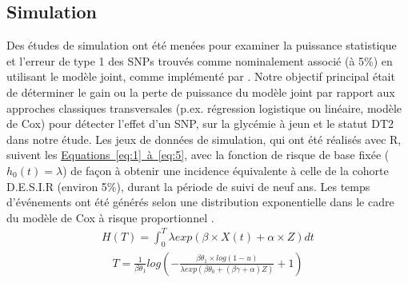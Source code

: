 \documentclass[11pt, a4paper]{article}
\begin{document}
\subsection{Simulation}
\par{Des études de simulation ont été menées pour examiner la puissance statistique et l'erreur de type 1 des SNPs trouvés comme nominalement associé (à 5\%) en utilisant le modèle joint, comme implémenté par \citet{rizopoulos_jm_2010}.
Notre objectif principal était de déterminer le gain ou la perte de puissance du modèle joint par rapport aux approches classiques transversales (p.ex. régression logistique ou linéaire, modèle de Cox)
pour détecter l'effet d'un SNP, sur la glycémie à jeun et le statut DT2 dans notre étude.
Les jeux de données de simulation, qui ont été réalisés avec R, suivent les \hyperref[eq:1]{Equations~\ref*{eq:1}~à~\ref{eq:5}},
avec la fonction de risque de base fixée ($h_0(t)=\lambda$) de façon à obtenir une incidence équivalente à celle de la cohorte D.E.S.I.R (environ 5\%), durant la période de suivi de neuf ans.
Les temps d'événements ont été générés selon une distribution exponentielle dans le cadre du modèle de Cox à risque proportionnel \citep{austin_generating_2012}.
\begin{eqnarray}H(T)=\int_0^T \lambda exp(\beta \times X(t) + \alpha \times Z) dt\end{eqnarray}
\begin{eqnarray}T=\frac{1}{\beta\theta_1} log\left( - \frac{\beta\theta_1 \times log(1-u)}{\lambda exp(\beta\theta_0+(\beta\gamma+\alpha)Z)}+1 \right)\end{eqnarray}
}

\clearpage
\end{document}
